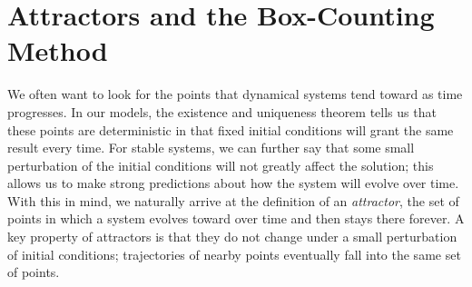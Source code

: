 \section{Attractors and the Box-Counting Method}
We often want to look for the points that dynamical systems tend toward as time progresses. 
In our models, the existence and uniqueness theorem tells us that these points are deterministic in that fixed initial conditions will grant the same result every time. 
For stable systems, we can further say that some small perturbation of the initial conditions will not greatly affect the solution; this allows us to make strong predictions about how the system will evolve over time. 
With this in mind, we naturally arrive at the definition of an \emph{attractor}, the set of points in which a system evolves toward over time and then stays there forever. 
A key property of attractors is that they do not change under a small perturbation of initial conditions; trajectories of nearby points eventually fall into the same set of points. \cite{feldman2012chaos}




